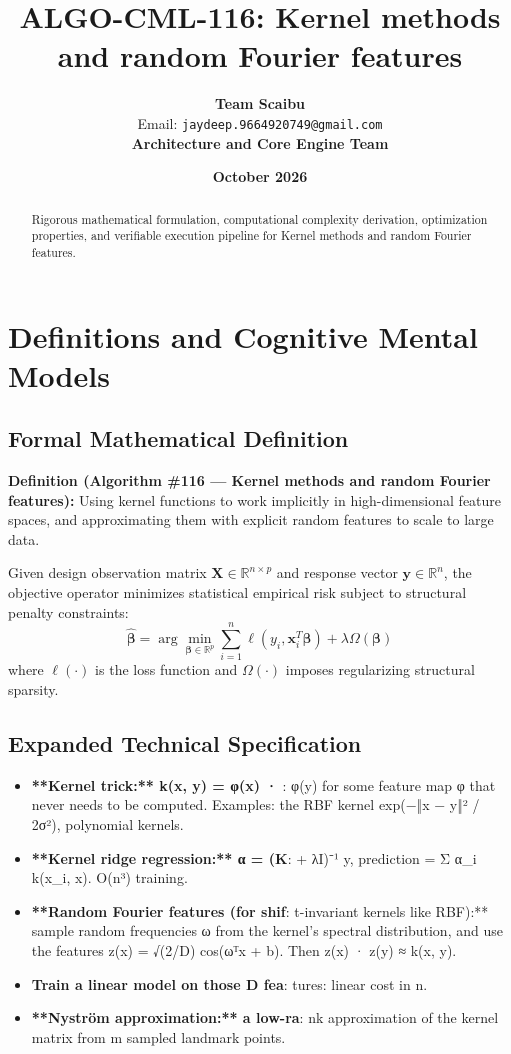 \documentclass[11pt,a4paper]{article}
\title{\textbf{ALGO-CML-116: Kernel methods and random Fourier features}}
\author{\textbf{Team Scaibu} \\ \small Email: \texttt{jaydeep.9664920749@gmail.com} \\ \small \textbf{Architecture and Core Engine Team}}
\date{\textbf{October 2026}}
\theoremstyle{definition}
\begin{document}
\maketitle

\begin{abstract}
Rigorous mathematical formulation, computational complexity derivation, optimization properties, and verifiable execution pipeline for Kernel methods and random Fourier features.
\end{abstract}

\section{Definitions and Cognitive Mental Models}

\subsection{Formal Mathematical Definition}
\textbf{Definition (Algorithm \#116 --- Kernel methods and random Fourier features):}
Using kernel functions to work implicitly in high-dimensional feature spaces, and approximating them with explicit random features to scale to large data.

Given design observation matrix $\mathbf{X} \in \mathbb{R}^{n \times p}$ and response vector $\mathbf{y} \in \mathbb{R}^n$, the objective operator minimizes statistical empirical risk subject to structural penalty constraints:
\begin{equation}
\hat{\boldsymbol{\beta}} = \arg\min_{\boldsymbol{\beta} \in \mathbb{R}^p} \sum_{i=1}^n \ell(y_i, \mathbf{x}_i^T \boldsymbol{\beta}) + \lambda \Omega(\boldsymbol{\beta})
\end{equation}
where $\ell(\cdot)$ is the loss function and $\Omega(\cdot)$ imposes regularizing structural sparsity.

\subsection{Expanded Technical Specification}
\begin{itemize}
\item \textbf{**Kernel trick:** k(x, y) = φ(x) · }: φ(y) for some feature map φ that never needs to be computed. Examples: the RBF kernel exp(−‖x − y‖² / 2σ²), polynomial kernels.
\item \textbf{**Kernel ridge regression:** α = (K}:  + λI)⁻¹ y, prediction = Σ α\_i k(x\_i, x). O(n³) training.
\item \textbf{**Random Fourier features (for shif}: t-invariant kernels like RBF):** sample random frequencies ω from the kernel's spectral distribution, and use the features z(x) = √(2/D) cos(ωᵀx + b). Then z(x) · z(y) ≈ k(x, y).
\item \textbf{Train a linear model on those D fea}: tures: linear cost in n.
\item \textbf{**Nyström approximation:** a low-ra}: nk approximation of the kernel matrix from m sampled landmark points.
\end{itemize}
\end{document}
